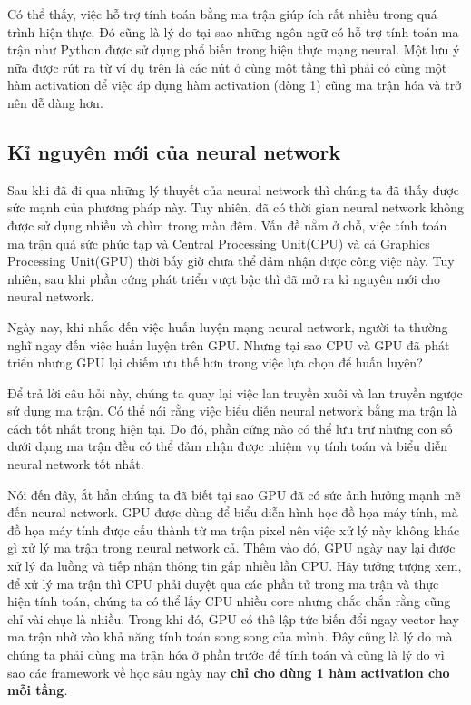 Có thể thấy, việc hỗ trợ tính toán bằng ma trận giúp ích rất nhiều trong quá trình hiện thực. Đó cũng là lý do tại sao những ngôn ngữ có hỗ trợ tính toán ma trận như Python được sử dụng phổ biến trong hiện thực mạng neural. Một lưu ý nữa được rút ra từ ví dụ trên là các nút ở cùng một tầng thì phải có cùng một hàm activation để việc áp dụng hàm activation (dòng 1) cũng ma trận hóa và trở nên dễ dàng hơn.

\subsection{Kỉ nguyên mới của neural network}
Sau khi đã đi qua những lý thuyết của neural network thì chúng ta đã thấy được sức mạnh của phương pháp này. Tuy nhiên, đã có thời gian neural network không được sử dụng nhiều và chìm trong màn đêm. Vấn đề nằm ở chỗ, việc tính toán ma trận quá sức phức tạp và Central Processing Unit(CPU) và cả Graphics Processing Unit(GPU) thời bấy giờ chưa thể đảm nhận được công việc này. Tuy nhiên, sau khi phần cứng phát triển vượt bậc thì đã mở ra kỉ nguyên mới cho neural network.

Ngày nay, khi nhắc đến việc huấn luyện mạng neural network, người ta thường nghĩ ngay đến việc huấn luyện trên GPU. Nhưng tại sao CPU và GPU đã phát triển nhưng GPU lại chiếm ưu thế hơn trong việc lựa chọn để huấn luyện?

Để trả lời câu hỏi này, chúng ta quay lại việc lan truyền xuôi và lan truyền ngược sử dụng ma trận. Có thể nói rằng việc biểu diễn neural network bằng ma trận là cách tốt nhất trong hiện tại. Do đó, phần cứng nào có thể lưu trữ những con số dưới dạng ma trận đều có thể đảm nhận được nhiệm vụ tính toán và biểu diễn neural network tốt nhất.

Nói đến đây, ắt hẳn chúng ta đã biết tại sao GPU đã có sức ảnh hưởng mạnh mẽ đến neural network. GPU được dùng để biểu diễn hình học đồ họa máy tính, mà đồ họa máy tính được cấu thành từ ma trận pixel nên việc xử lý này không khác gì xử lý ma trận trong neural network cả. Thêm vào đó, GPU ngày nay lại được xử lý đa luồng và tiếp nhận thông tin gấp nhiều lần CPU. Hãy tưởng tượng xem, để xử lý ma trận thì CPU phải duyệt qua các phần tử trong ma trận và thực hiện tính toán, chúng ta có thể lấy CPU nhiều core nhưng chắc chắn rằng cũng chỉ vài chục là nhiều. Trong khi đó, GPU có thê lập tức biến đổi ngay vector hay ma trận nhờ vào khả năng tính toán song song của mình. Đây cũng là lý do mà chúng ta phải dùng ma trận hóa ở phần trước để tính toán và cũng là lý do vì sao các framework về học sâu ngày nay \textbf{chỉ cho dùng 1 hàm activation cho mỗi tầng}.

